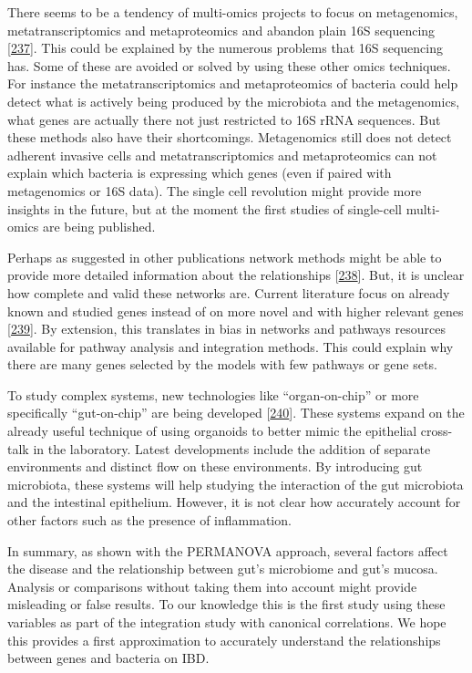 \documentclass[
  12pt,
  a4paper,
  twoside,
  openright]{book}
\begin{document}
There seems to be a tendency of multi-omics projects to focus on metagenomics, metatranscriptomics and metaproteomics and abandon plain 16S sequencing {[}\protect\hyperlink{ref-zhang2019}{237}{]}.
This could be explained by the numerous problems that 16S sequencing has.
Some of these are avoided or solved by using these other omics techniques.
For instance the metatranscriptomics and metaproteomics of bacteria could help detect what is actively being produced by the microbiota and the metagenomics, what genes are actually there not just restricted to 16S rRNA sequences.
But these methods also have their shortcomings.
Metagenomics still does not detect adherent invasive cells and metatranscriptomics and metaproteomics can not explain which bacteria is expressing which genes (even if paired with metagenomics or 16S data).
The single cell revolution might provide more insights in the future, but at the moment the first studies of single-cell multi-omics are being published.

Perhaps as suggested in other publications network methods might be able to provide more detailed information about the relationships {[}\protect\hyperlink{ref-jiang2019}{238}{]}.
But, it is unclear how complete and valid these networks are.
Current literature focus on already known and studied genes instead of on more novel and with higher relevant genes {[}\protect\hyperlink{ref-haynes2018}{239}{]}.
By extension, this translates in bias in networks and pathways resources available for pathway analysis and integration methods.
This could explain why there are many genes selected by the models with few pathways or gene sets.

To study complex systems, new technologies like ``organ-on-chip'' or more specifically ``gut-on-chip'' are being developed {[}\protect\hyperlink{ref-collij2021}{240}{]}.
These systems expand on the already useful technique of using organoids to better mimic the epithelial cross-talk in the laboratory.
Latest developments include the addition of separate environments and distinct flow on these environments.
By introducing gut microbiota, these systems will help studying the interaction of the gut microbiota and the intestinal epithelium.
However, it is not clear how accurately account for other factors such as the presence of inflammation.

In summary, as shown with the PERMANOVA approach, several factors affect the disease and the relationship between gut's microbiome and gut's mucosa.
Analysis or comparisons without taking them into account might provide misleading or false results.
To our knowledge this is the first study using these variables as part of the integration study with canonical correlations.
We hope this provides a first approximation to accurately understand the relationships between genes and bacteria on IBD.
\end{document}
